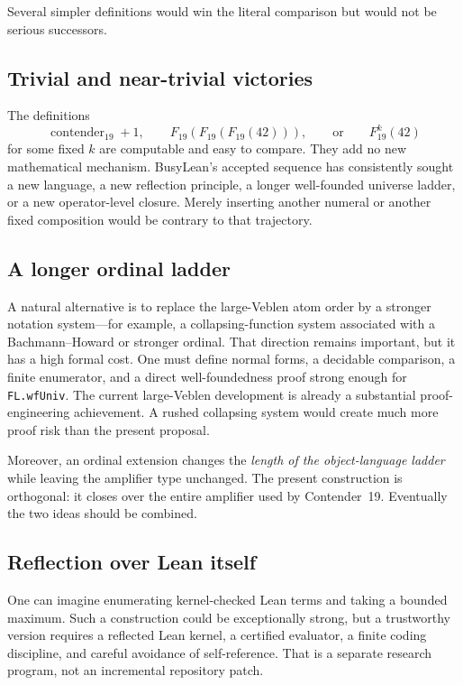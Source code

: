 \documentclass[11pt]{article}
\theoremstyle{definition}
\theoremstyle{remark}
\newcommand{\lean}[1]{\nolinkurl{#1}}
\begin{document}
Several simpler definitions would win the literal comparison but would not be
serious successors.

\subsection{Trivial and near-trivial victories}

The definitions
\[
  \operatorname{contender}_{19}+1,
  \qquad
  F_{19}(F_{19}(F_{19}(42))),
  \qquad
  \text{or}\qquad
  F_{19}^{k}(42)
\]
for some fixed $k$ are computable and easy to compare. They add no new
mathematical mechanism. BusyLean's accepted sequence has consistently sought a
new language, a new reflection principle, a longer well-founded universe
ladder, or a new operator-level closure. Merely inserting another numeral or
another fixed composition would be contrary to that trajectory.

\subsection{A longer ordinal ladder}

A natural alternative is to replace the large-Veblen atom order by a stronger
notation system---for example, a collapsing-function system associated with a
Bachmann--Howard or stronger ordinal. That direction remains important, but it
has a high formal cost. One must define normal forms, a decidable comparison,
a finite enumerator, and a direct well-foundedness proof strong enough for
\lean{FL.wfUniv}. The current large-Veblen development is already a substantial
proof-engineering achievement. A rushed collapsing system would create much
more proof risk than the present proposal.

Moreover, an ordinal extension changes the \emph{length of the object-language
ladder} while leaving the amplifier type unchanged. The present construction is
orthogonal: it closes over the entire amplifier used by Contender~19.
Eventually the two ideas should be combined.

\subsection{Reflection over Lean itself}

One can imagine enumerating kernel-checked Lean terms and taking a bounded
maximum. Such a construction could be exceptionally strong, but a trustworthy
version requires a reflected Lean kernel, a certified evaluator, a finite
coding discipline, and careful avoidance of self-reference. That is a separate
research program, not an incremental repository patch.
\end{document}
